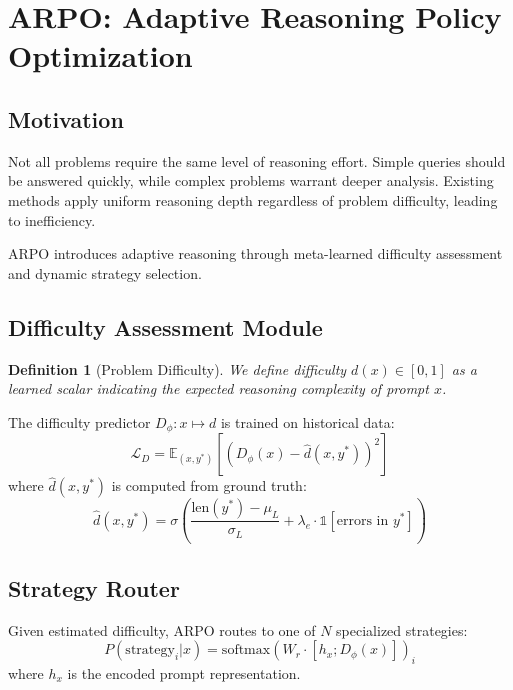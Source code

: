 \documentclass[11pt,a4paper]{article}
\newtheorem{definition}[theorem]{Definition}
\newcommand{\E}{\mathbb{E}}
\begin{document}
\section{ARPO: Adaptive Reasoning Policy Optimization}

\subsection{Motivation}

Not all problems require the same level of reasoning effort. Simple queries should be answered quickly, while complex problems warrant deeper analysis. Existing methods apply uniform reasoning depth regardless of problem difficulty, leading to inefficiency.

ARPO introduces adaptive reasoning through meta-learned difficulty assessment and dynamic strategy selection.

\subsection{Difficulty Assessment Module}

\begin{definition}[Problem Difficulty]
We define difficulty $d(x) \in [0, 1]$ as a learned scalar indicating the expected reasoning complexity of prompt $x$.
\end{definition}

The difficulty predictor $D_\phi: x \mapsto d$ is trained on historical data:
\begin{equation}
    \mathcal{L}_D = \E_{(x, y^*)} \left[ (D_\phi(x) - \hat{d}(x, y^*))^2 \right]
\end{equation}
where $\hat{d}(x, y^*)$ is computed from ground truth:
\begin{equation}
    \hat{d}(x, y^*) = \sigma\left(\frac{\text{len}(y^*) - \mu_L}{\sigma_L} + \lambda_e \cdot \mathbb{1}[\text{errors in } y^*]\right)
\end{equation}

\subsection{Strategy Router}

Given estimated difficulty, ARPO routes to one of $N$ specialized strategies:
\begin{equation}
    P(\text{strategy}_i | x) = \text{softmax}(W_r \cdot [h_x; D_\phi(x)])_i
\end{equation}
where $h_x$ is the encoded prompt representation.
\end{document}

